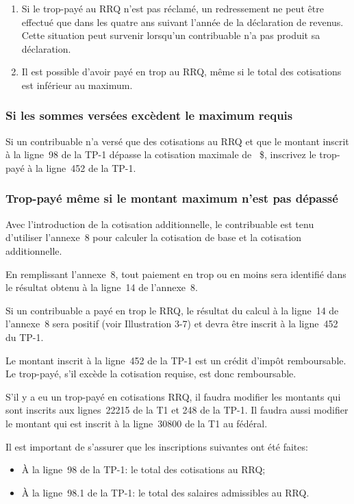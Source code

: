 \begin{note}
	\begin{enumerate}
		\item Si le trop-payé au RRQ n'est pas réclamé, un redressement ne peut être effectué que dans les quatre ans suivant l'année de la déclaration de revenus. Cette situation peut survenir lorsqu'un contribuable n'a pas produit sa déclaration.
		\item 	Il est possible d'avoir payé en trop au RRQ, même si le total des cotisations est inférieur au maximum.
	\end{enumerate}
\end{note}

\subsubsection{Si les sommes versées excèdent le maximum requis}
Si un contribuable n'a versé que des cotisations au RRQ et que le montant inscrit à la ligne~98 de la TP-1 dépasse la cotisation maximale de ~\$, inscrivez le trop-payé à la ligne~452 de la TP-1.

\subsubsection{Trop-payé même si le montant maximum n'est pas dépassé}
Avec l'introduction de la cotisation additionnelle, le contribuable est tenu d'utiliser l'annexe~8 pour calculer la cotisation de base et la cotisation additionnelle.

En remplissant l'annexe~8, tout paiement en trop ou en moins sera identifié dans le résultat obtenu à la ligne~14 de l'annexe~8.

Si un contribuable a payé en trop le RRQ, le résultat du calcul à la ligne~14 de l'annexe~8 sera positif (voir Illustration 3-7) et devra être inscrit à la ligne~452 du
TP-1.

Le montant inscrit à la ligne~452 de la TP-1 est un crédit d'impôt remboursable. Le trop-payé, s'il excède la cotisation requise, est donc remboursable.

S'il y a eu un trop-payé en cotisations RRQ, il faudra modifier les montants qui sont inscrits aux lignes~22215 de la T1 et 248 de la TP-1. Il faudra aussi modifier le montant qui est inscrit à la ligne~30800 de la T1 au fédéral.

\begin{note}
	Il est important de s'assurer que les inscriptions suivantes ont été faites:
	\begin{itemize}
		\item À la ligne~98 de la TP-1: le total des cotisations au RRQ;
		\item À la ligne~98.1 de la TP-1: le total des salaires admissibles au RRQ.
	\end{itemize}
\end{note}


